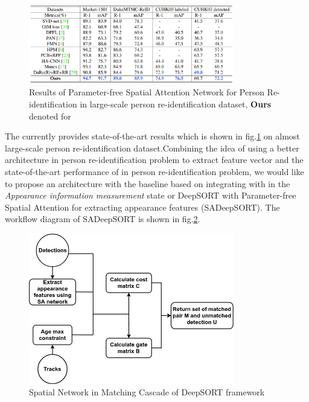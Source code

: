 \begin{figure}[h!]
    \centering
    \includegraphics[width=0.8\textwidth]{Chapters/Fig/person-re-id-performance.png}
    \caption{Results of Parameter-free Spatial Attention Network for Person Re-identification in large-scale person re-identification dataset,
    \textbf{Ours} denoted for \cite{SA}}
    \label{fig:sa_results}
\end{figure}
The \cite{SA} currently provides state-of-the-art results which is shown in fig.\ref{fig:sa_results} on almost large-scale person
re-identification dataset.Combining the idea of using a better architecture in person re-identification problem to extract feature vector and the state-of-the-art performance of
\cite{SA} in person re-identification problem, we would like to propose an architecture with the baseline based on \cite{Wojke2017simple} integrating with \cite{SA}
in the \textit{Appearance information measurement} state or DeepSORT with Parameter-free Spatial Attention for extracting appearance features (SADeepSORT). The workflow diagram of SADeepSORT is shown
in fig.\ref{fig:sa_matching}. 
\begin{figure}[h!]
    \centering
    \includegraphics[width=0.8\textwidth]{Chapters/Fig/Thesis_diagram-SA_Matching_Cascade.png}
    \caption{Spatial Network in Matching Cascade of DeepSORT framework}
    \label{fig:sa_matching}
\end{figure}

